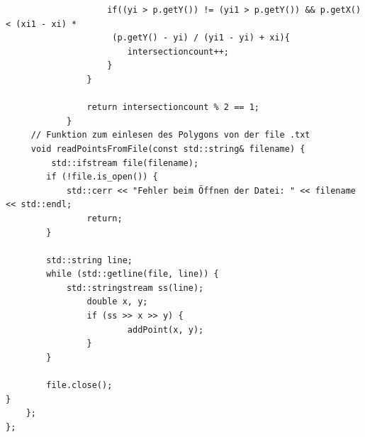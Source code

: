 \documentclass{article}
\begin{document}
\begin{verbatim}
					if((yi > p.getY()) != (yi1 > p.getY()) && p.getX() < (xi1 - xi) *
					 (p.getY() - yi) / (yi1 - yi) + xi){
						intersectioncount++;
					}
				}

				return intersectioncount % 2 == 1;
			}
	 // Funktion zum einlesen des Polygons von der file .txt
	 void readPointsFromFile(const std::string& filename) {
		 std::ifstream file(filename);
		if (!file.is_open()) {
			std::cerr << "Fehler beim Öffnen der Datei: " << filename << std::endl;
				return;
		}

		std::string line;
		while (std::getline(file, line)) {
			std::stringstream ss(line);
				double x, y;
				if (ss >> x >> y) {
						addPoint(x, y);
				}
		}

		file.close();
}
	};
};
\end{verbatim}
\end{document}
